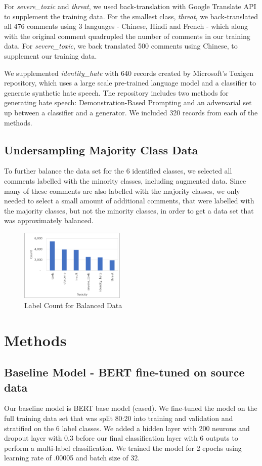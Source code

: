 \documentclass[11pt,a4paper]{article}
\begin{document}
For \emph{severe\_toxic} and \emph{threat}, we used back-translation with Google Translate API to supplement the training data.  For the smallest class, \emph{threat}, we back-translated all 476 comments using 3 languages - Chinese, Hindi and French - which along with the original comment quadrupled the number of comments in our training data.  For \emph{severe\_toxic}, we back translated 500 comments using Chinese, to supplement our training data.

We supplemented \emph{identity\_hate} with 640 records created by Microsoft's Toxigen repository, which uses a large scale pre-trained language model and a classifier to generate synthetic hate speech.  The repository includes two methods for generating hate speech:  Demonstration-Based Prompting and an adversarial set up between a classifier and a generator.  We included 320 records from each of the methods.

\subsection{Undersampling Majority Class Data}
To further balance the data set for the 6 identified classes, we selected all comments labelled with the minority classes, including augmented data.  Since many of these comments are also labelled with the majority classes, we only needed to select a small amount of additional comments, that were labelled with the majority classes, but not the minority classes, in order to get a data set that was approximately balanced.


\begin{figure}[h!]
\centering
\includegraphics[width=50mm,scale=0.5]{label_counts_balanced.png}
\caption{Label Count for Balanced Data}
\label{Fig2. label count vs toxicity}
\end{figure}


\section{Methods}

\subsection{Baseline Model - BERT fine-tuned on source data}
Our baseline model is BERT base model (cased). We fine-tuned the model on the full training data set that was split 80:20 into training and validation and stratified on the 6 label classes. We added a hidden layer with 200 neurons and dropout layer with 0.3 before our final classification layer with 6 outputs to perform a multi-label classification. We trained the model for 2 epochs using learning rate of .00005 and batch size of 32.
\end{document}
